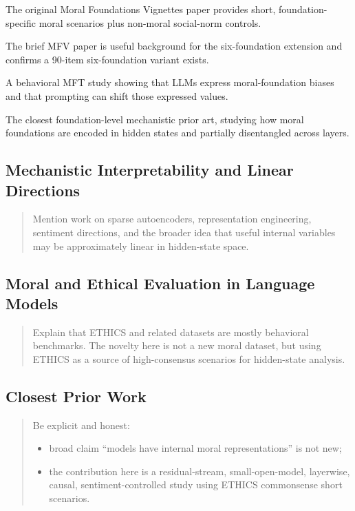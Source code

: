\documentclass[11pt]{article}
\newcommand{\draftnote}[1]{%
  \begin{quote}\footnotesize\color{gray}#1\end{quote}%
}
\begin{document}
{\begin{description}[leftmargin=8em,style=nextline]
    \item[\cite{clifford2015moral}] The original Moral Foundations Vignettes paper provides short, foundation-specific moral scenarios plus non-moral social-norm controls.
    \item[\cite{crone2021developing}] The brief MFV paper is useful background for the six-foundation extension and confirms a 90-item six-foundation variant exists.
    \item[\cite{abdulhai2024moral}] A behavioral MFT study showing that LLMs express moral-foundation biases and that prompting can shift those expressed values.
    \item[\cite{yu2026tracing}] The closest foundation-level mechanistic prior art, studying how moral foundations are encoded in hidden states and partially disentangled across layers.
\end{description}
}

\subsection{Mechanistic Interpretability and Linear Directions}
\draftnote{
Mention work on sparse autoencoders, representation engineering, sentiment directions, and the broader idea that useful internal variables may be approximately linear in hidden-state space.
}

\subsection{Moral and Ethical Evaluation in Language Models}
\draftnote{
Explain that ETHICS and related datasets are mostly behavioral benchmarks. The novelty here is not a new moral dataset, but using ETHICS as a source of high-consensus scenarios for hidden-state analysis.
}

\subsection{Closest Prior Work}
\draftnote{
Be explicit and honest:
\begin{itemize}[leftmargin=1.5em]
    \item broad claim ``models have internal moral representations'' is not new;
    \item the contribution here is a residual-stream, small-open-model, layerwise, causal, sentiment-controlled study using ETHICS commonsense short scenarios.
\end{itemize}
}
\end{document}
